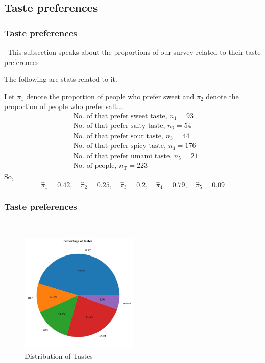 \documentclass{beamer}
\begin{document}
\subsection{Taste preferences }
\begin{frame}
    \frametitle{Taste preferences}\
    This subsection speaks about the proportions of our survey related to their taste preferences
    
    The following are stats related to it.
    
    Let $\pi_1$ denote the proportion of people who prefer sweet and $\pi_2$ denote the proportion of people who prefer salt...
    \begin{align}
        &\text{No. of that prefer sweet taste, } n_{\text{1}} = 93 \\
        &\text{No. of that prefer salty taste, } n_{\text{2}} = 54 \\
        &\text{No. of that prefer sour taste, } n_{\text{3}} = 44\\
        &\text{No. of that prefer spicy taste, } n_{\text{4}} = 176 \\
        &\text{No. of that prefer umami taste, } n_{\text{5}} = 21\\
        &\text{No. of people, } n_{\text{T}} = 223
    \end{align}
    So,
    \begin{equation}
        \hat{\pi}_1  = 0.42, \quad \hat{\pi}_2  = 0.25, \quad \hat{\pi}_3  = 0.2, \quad \hat{\pi}_4  = 0.79, \quad \hat{\pi}_5  = 0.09
    \end{equation}
\end{frame}

\begin{frame}
    \frametitle{Taste preferences }\
    \begin{figure}
    \centering
    \includegraphics[width=0.5\textwidth]{Distribution of Tastes.jpg} %
    \caption{Distribution of Tastes} %
    \label{fig:Distribution of Tastes} %
    \end{figure}
\end{frame}
\end{document}

